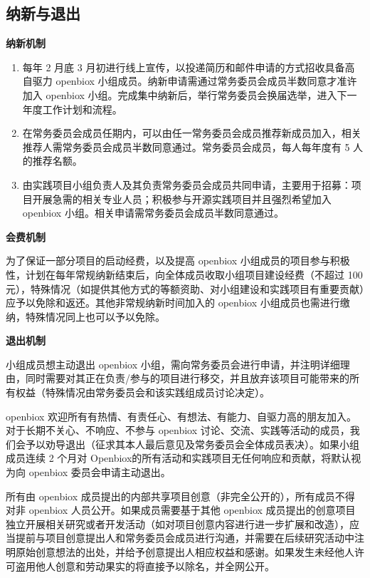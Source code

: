 \documentclass[]{article}
\providecommand{\tightlist}{%
  \setlength{\itemsep}{0pt}\setlength{\parskip}{0pt}}
\begin{document}
\subsection{纳新与退出}

\textbf{纳新机制}

\begin{enumerate}
\def\labelenumi{\arabic{enumi}.}
\tightlist
\item
  每年 2 月底 3
  月初进行线上宣传，以投递简历和邮件申请的方式招收具备高自驱力 openbiox
  小组成员。纳新申请需通过常务委员会成员半数同意才准许加入 openbiox
  小组。完成集中纳新后，举行常务委员会换届选举，进入下一年度工作计划和流程。
\item
  在常务委员会成员任期内，可以由任一常务委员会成员推荐新成员加入，相关推荐人需常务委员会成员半数同意通过。常务委员会成员，每人每年度有
  5 人的推荐名额。
\item
  由实践项目小组负责人及其负责常务委员会成员共同申请，主要用于招募：项目开展急需的相关专业人员；积极参与开源实践项目并且强烈希望加入
  openbiox 小组。相关申请需常务委员会成员半数同意通过。
\end{enumerate}

\textbf{会费机制}

为了保证一部分项目的启动经费，以及提高 openbiox
小组成员的项目参与积极性，计划在每年常规纳新结束后，向全体成员收取小组项目建设经费（不超过
100
元），特殊情况（如提供其他方式的等额资助、对小组建设和实践项目有重要贡献）应予以免除和返还。其他非常规纳新时间加入的
openbiox 小组成员也需进行缴纳，特殊情况同上也可以予以免除。

\textbf{退出机制}

小组成员想主动退出 openbiox
小组，需向常务委员会进行申请，并注明详细理由，同时需要对其正在负责/参与的项目进行移交，并且放弃该项目可能带来的所有权益（特殊情况由常务委员会和该实践组成员讨论决定）。

openbiox
欢迎所有有热情、有责任心、有想法、有能力、自驱力高的朋友加入。对于长期不关心、不响应、不参与
openbiox
讨论、交流、实践等活动的成员，我们会予以劝导退出（征求其本人最后意见及常务委员会全体成员表决）。如果小组成员连续
2 个月对 Openbiox的所有活动和实践项目无任何响应和贡献，将默认视为向
openbiox 委员会申请主动退出。

所有由 openbiox
成员提出的内部共享项目创意（非完全公开的），所有成员不得对非 openbiox
人员公开。如果成员需要基于其他 openbiox
成员提出的创意项目独立开展相关研究或者开发活动（如对项目创意内容进行进一步扩展和改造），应当提前与项目创意提出人和常务委员会成员进行沟通，并需要在后续研究活动中注明原始创意想法的出处，并给予创意提出人相应权益和感谢。如果发生未经他人许可盗用他人创意和劳动果实的将直接予以除名，并全网公开。
\end{document}
